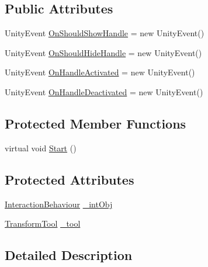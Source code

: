 \subsection*{Public Attributes}
\begin{DoxyCompactItemize}
\item 
Unity\+Event \mbox{\hyperlink{class_leap_1_1_unity_1_1_examples_1_1_transform_handle_a8924cc2ac0c28600de287baa3b1aa574}{On\+Should\+Show\+Handle}} = new Unity\+Event()
\item 
Unity\+Event \mbox{\hyperlink{class_leap_1_1_unity_1_1_examples_1_1_transform_handle_aa603853e0cece43e989c61e4cfb8b4bc}{On\+Should\+Hide\+Handle}} = new Unity\+Event()
\item 
Unity\+Event \mbox{\hyperlink{class_leap_1_1_unity_1_1_examples_1_1_transform_handle_a8b3831231f8f84afbf94271855696acf}{On\+Handle\+Activated}} = new Unity\+Event()
\item 
Unity\+Event \mbox{\hyperlink{class_leap_1_1_unity_1_1_examples_1_1_transform_handle_a3d5ec334ec1ef1234f0ff6f78179c1f8}{On\+Handle\+Deactivated}} = new Unity\+Event()
\end{DoxyCompactItemize}
\subsection*{Protected Member Functions}
\begin{DoxyCompactItemize}
\item 
virtual void \mbox{\hyperlink{class_leap_1_1_unity_1_1_examples_1_1_transform_handle_ab2c8be5053c981fff46ab6b5f99cac13}{Start}} ()
\end{DoxyCompactItemize}
\subsection*{Protected Attributes}
\begin{DoxyCompactItemize}
\item 
\mbox{\hyperlink{class_leap_1_1_unity_1_1_interaction_1_1_interaction_behaviour}{Interaction\+Behaviour}} \mbox{\hyperlink{class_leap_1_1_unity_1_1_examples_1_1_transform_handle_a4d4e476a89c1c3382524ef991fac85e7}{\+\_\+int\+Obj}}
\item 
\mbox{\hyperlink{class_leap_1_1_unity_1_1_examples_1_1_transform_tool}{Transform\+Tool}} \mbox{\hyperlink{class_leap_1_1_unity_1_1_examples_1_1_transform_handle_abe8b50e9b861797f1347cbf9e4f0aa4b}{\+\_\+tool}}
\end{DoxyCompactItemize}


\subsection{Detailed Description}


